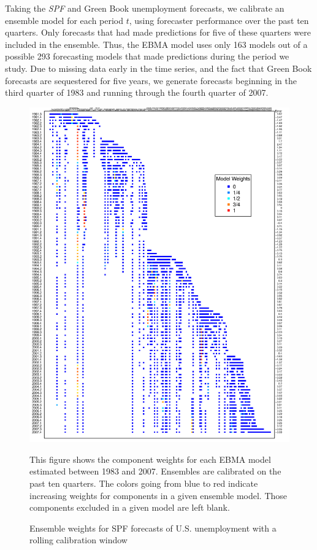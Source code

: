 \documentclass[12pt,fullpage,endnotes]{article}
\begin{document}
Taking the \textit{SPF} and Green Book unemployment forecasts, we
calibrate an ensemble model for each period $t$, using forecaster
performance over the past ten quarters.  Only forecasts that had made
predictions for five of these quarters were included in the ensemble.
Thus, the EBMA model uses only 163 models out of a possible 293
forecasting models that made predictions during the period we study.
Due to missing data early in the time series, and the fact that Green
Book forecasts are sequestered for five years, we generate forecasts
beginning in the third quarter of 1983 and running through the fourth
quarter of 2007.



\begin{figure}[h]
  \caption{Ensemble weights for SPF forecasts of U.S. unemployment
    with a rolling calibration window}
\label{modelWeights}
\begin{center}
\includegraphics[scale=.95]{awesome}
\end{center}

\footnotesize This figure shows the component weights for each EBMA
model estimated between 1983 and 2007. Ensembles are calibrated on the
past ten quarters. The colors going from blue to red indicate
increasing weights for components in a given ensemble model. Those
components excluded in a given model are left blank.

\end{figure}
\end{document}
